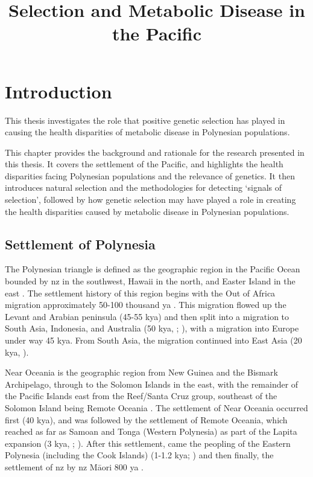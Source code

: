 \documentclass[]{report}
\title{Selection and Metabolic Disease in the Pacific}
\date{}
\newcommand{\tex}[1]{#1}
\begin{document}
\maketitle

\address{710 Cumberland St, Dunedin, NZ}

\frontstuff

\chapter{Introduction}\label{introduction}

\glsresetall

This thesis investigates the role that positive genetic selection has
played in causing the health disparities of metabolic disease in
Polynesian populations.

This chapter provides the background and rationale for the research
presented in this thesis. It covers the settlement of the Pacific, and
highlights the health disparities facing Polynesian populations and the
relevance of genetics. It then introduces natural selection and the
methodologies for detecting `signals of selection', followed by how
genetic selection may have played a role in creating the health
disparities caused by metabolic disease in Polynesian populations.

\section{Settlement of Polynesia}\label{settlement-of-polynesia}

The Polynesian triangle is defined as the geographic region in the
Pacific Ocean bounded by \Gls{nz} in the southwest, Hawaii in the north,
and Easter Island in the east \citep{Barcham2009}. The settlement
history of this region begins with the Out of Africa migration
approximately 50-100 thousand \gls{ya} \citep{Nielsen2017}. This
migration flowed up the Levant and Arabian peninsula (45-55 k\gls{ya})
and then split into a migration to South Asia, Indonesia, and Australia
(50 k\gls{ya}, \citet{Kivisild1999}; \citet{Quintana-Murci1999}), with a
migration into Europe under way 45 k\gls{ya}. From South Asia, the
migration continued into East Asia (20 k\gls{ya}, \citet{Groucutt2015}).

Near Oceania is the geographic region from New Guinea and the Bismark
Archipelago, through to the Solomon Islands in the east, with the
remainder of the Pacific Islands east from the Reef/Santa Cruz group,
southeast of the Solomon Island being Remote Oceania
\citep{Matisoo-Smith2018}. The settlement of Near Oceania occurred first
(40 k\gls{ya}), and was followed by the settlement of Remote Oceania,
which reached as far as Samoan and Tonga (Western Polynesia) as part of
the Lapita expansion (3 k\gls{ya}, \citet{Matisoo-Smith2015};
\citet{Skoglund2016}). After this settlement, came the peopling of the
Eastern Polynesia (including the Cook Islands) (1-1.2 k\gls{ya};
\citet{Wilmshurst2011}) and then finally, the settlement of \glsdesc{nz}
by \gls{nz} M\tex{\={a}}ori 800 \gls{ya}
\citep{Duggan2014, Matisoo-Smith2015}.
\end{document}
